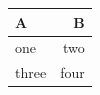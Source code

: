 \begin{tabular}{lr}
\toprule
A & B \\
\midrule
one & two \\
three & four \\
\bottomrule
\end{tabular}
